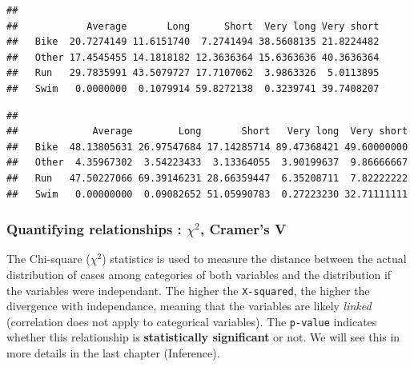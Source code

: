 \documentclass[
]{book}
\newenvironment{Shaded}{\begin{snugshade}}{\end{snugshade}}
\newcommand{\DataTypeTok}[1]{\textcolor[rgb]{0.13,0.29,0.53}{#1}}
\newcommand{\DecValTok}[1]{\textcolor[rgb]{0.00,0.00,0.81}{#1}}
\newcommand{\KeywordTok}[1]{\textcolor[rgb]{0.13,0.29,0.53}{\textbf{#1}}}
\newcommand{\NormalTok}[1]{#1}
\newcommand{\OperatorTok}[1]{\textcolor[rgb]{0.81,0.36,0.00}{\textbf{#1}}}
\newcommand{\StringTok}[1]{\textcolor[rgb]{0.31,0.60,0.02}{#1}}
\begin{document}
\begin{verbatim}
##        
##            Average       Long      Short  Very long Very short
##   Bike  20.7274149 11.6151740  7.2741494 38.5608135 21.8224482
##   Other 17.4545455 14.1818182 12.3636364 15.6363636 40.3636364
##   Run   29.7835991 43.5079727 17.7107062  3.9863326  5.0113895
##   Swim   0.0000000  0.1079914 59.8272138  0.3239741 39.7408207
\end{verbatim}

\begin{Shaded}
\end{Shaded}

\begin{verbatim}
##        
##             Average        Long       Short   Very long  Very short
##   Bike  48.13805631 26.97547684 17.14285714 89.47368421 49.60000000
##   Other  4.35967302  3.54223433  3.13364055  3.90199637  9.86666667
##   Run   47.50227066 69.39146231 28.66359447  6.35208711  7.82222222
##   Swim   0.00000000  0.09082652 51.05990783  0.27223230 32.71111111
\end{verbatim}

\hypertarget{quantifying-relationships-chi2-cramers-v}{%
\subsubsection{\texorpdfstring{Quantifying relationships : \(\chi^2\), Cramer's V}{Quantifying relationships : \textbackslash chi\^{}2, Cramer's V}}\label{quantifying-relationships-chi2-cramers-v}}

The Chi-square (\(\chi^2\)) statistics is used to measure the distance between the actual distribution of cases among categories of both variables and the distribution if the variables were independant. The higher the \texttt{X-squared}, the higher the divergence with independance, meaning that the variables are likely \emph{linked} (correlation does not apply to categorical variables). The \texttt{p-value} indicates whether this relationship is \textbf{statistically significant} or not. We will see this in more details in the last chapter (Inference).
\end{document}
